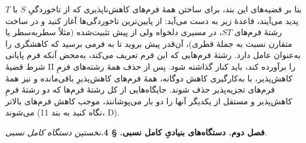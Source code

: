 \documentclass[11pt]{article}
\begin{document}
بنا بر قضیه‌های این بند، برای ساختن همهٔ فرم‌های کاهش‌ناپذیری که از تاخوردگیِ $S$ با $T$ پدید می‌آیند، قاعدهٔ زیر به دست می‌آید:
از پایین‌ترین تاخوردگی‌ها آغاز کنید و در ساخت رشتهٔ فرم‌های $ST$، در مسیری دلخواه ولی از پیش تثبیت‌شده (مثلاً سطر‌به‌سطر یا متقارن نسبت به جملهٔ قطری)، آن‌قدر پیش بروید تا به فرمی برسید که کاهشگری را به‌عنوان عامل دارد. رشتهٔ فرم‌هایی که این فرم تعریف می‌کند، به‌محض آنکه فرم پایانی شرط قضیهٔ II را برآورده کند، باید کنار گذاشته شود. پس از حذف همهٔ رشته‌های فرمِ کاهش‌پذیر، با به‌کارگیری کاهش دوگانه، همهٔ فرم‌های کاهش‌پذیرِ باقی‌مانده و نیز همهٔ فرم‌های تجزیه‌پذیر حذف شوند. جایگاه‌هایی از کل رشتهٔ فرم‌ها که دو رشتهٔ فرمِ کاهش‌پذیر و مستقل از یکدیگر آنها را دو بار می‌پوشانند، موجب کاهش فرم‌های بالاتر می‌شوند (نگاه کنید به بند 11، D).
\begin{center}
\textbf{فصل دوم. \quad دستگاه‌های بنیادیِ کامل نسبی.}
\textbf{§ 4.}\quad\emph{نخستین دستگاه کامل نسبی.}
\end{center}
\end{document}
